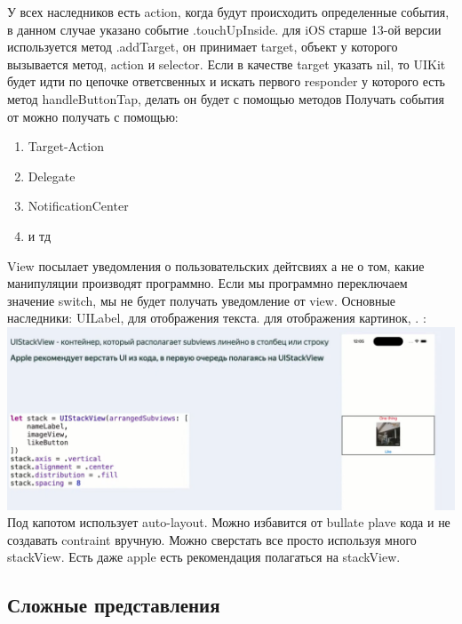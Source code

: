 \documentclass{article}
\begin{document}
    \newline
    У всех наследников  есть action, когда будут происходить определенные события, в данном случае указано событие .touchUpInside.
    \newline
    для iOS старше 13-ой версии используется метод .addTarget, он принимает target, объект у которого вызывается метод, action и selector.
    \newline
    Если в качестве target указать nil, то UIKit будет идти по цепочке ответсвенных и искать первого responder у которого есть метод handleButtonTap, делать он будет с помощью методов 
    \newline
    Получать события от  можно получать с помощью: 
    \begin{enumerate}
        \item Target-Action
        \item Delegate
        \item NotificationCenter
        \item и тд
    \end{enumerate}
    View посылает уведомления о пользовательских дейтсвиях а не о том, какие манипуляции производят программно. Если мы программно переключаем значение switch, мы не будет получать уведомление от view.
    \newline
    Основные наследники: UILabel, для отображения текста.  для отображения картинок, . 
    \newline
    :
    \includegraphics[scale = 0.2]{pic/Снимок экрана 2023-08-01 в 00.47.28.png}
    \newline
    Под капотом использует auto-layout. Можно избавится от bullate plave кода и не создавать contraint вручную. Можно сверстать все просто используя много stackView. Есть даже apple есть рекомендация полагаться на stackView.
    \subsection{Сложные представления}
\end{document}
